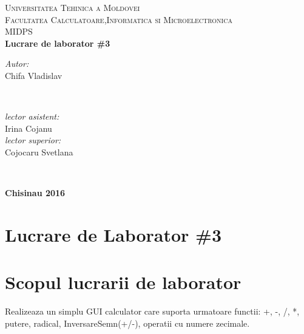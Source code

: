 \documentclass[11pt]{article}
\begin{document}
\begin{titlepage}

\begin{center}

\textsc{\large Universitatea Tehinica a Moldovei}\\[0.5cm]
\textsc{\large Facultatea Calculatoare,Informatica si Microelectronica}\\[0.5cm]
\vspace{25 mm}
\textsc{\large MIDPS}\\[0.5cm]
\textbf{\large Lucrare de laborator \#3}\\[0.5cm]
 \vspace{45 mm}

      \begin{minipage}{0.4\textwidth}
      \begin{flushleft} \large
      \emph{Autor:}\\
      Chifa Vladislav
      \end{flushleft}
      \end{minipage}
      ~
      \begin{minipage}{0.4\textwidth}
      \begin{flushright} \large
      \emph{lector asistent:} \\
      Irina Cojanu \\ 
      \emph{lector superior:}\\
     Cojocaru Svetlana
      \end{flushright}
      \end{minipage}\\[4cm]

      \vspace{10 mm}
   
      \textbf{\large Chisinau 2016}
     \newpage
       

\end{center}
\end{titlepage}

\section*{Lucrare de Laborator \#3}

\section{Scopul lucrarii de laborator}
Realizeaza un simplu GUI calculator care suporta urmatoare functii: +, -, /, *, putere, radical, InversareSemn(+/-), operatii cu numere zecimale.
\end{document}
